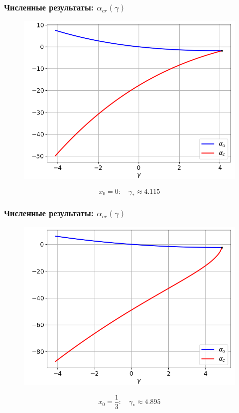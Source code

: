 \documentclass[fullscreen=true, unicode, bookmarks=false]{beamer}
\begin{document}
\begin{frame}
\frametitle{ Численные результаты: $ \alpha_{cr}(\gamma) $ }

\begin{figure} 
\includegraphics[scale=0.53]{alphas_0.png}  
\end{figure}

$$ x_0 = 0: \quad \gamma_* \approx 4.115 $$

\end{frame}

\begin{frame}
\frametitle{ Численные результаты: $ \alpha_{cr}(\gamma) $ }

\begin{figure} 
\includegraphics[scale=0.53]{alphas_13.png}  
\end{figure}

$$ x_0 = \frac{1}{3}: \quad \gamma_* \approx 4.895 $$

\end{frame}
\end{document}
